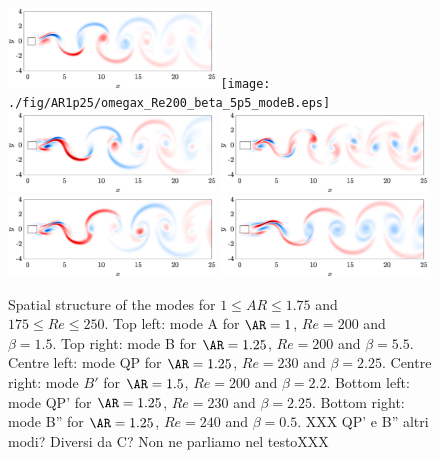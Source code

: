 %
\begin{figure}
  \centering
  \includegraphics[width=0.49\textwidth]{./fig/AR1/omegax_Re200_beta_1p5_modeA.eps}
  \texttt{[image: ./fig/AR1p25/omegax\_Re200\_beta\_5p5\_modeB.eps]}
  \includegraphics[width=0.49\textwidth]{./fig/AR1p25/omegax_Re230_beta_2p25_modeC.eps}
  \includegraphics[width=0.49\textwidth]{./fig/AR1p5/omegax_Re200_beta_2p2_modeBp.eps}
  \includegraphics[width=0.49\textwidth]{./fig/AR1p25/omegax_Re230_beta_2p25_modeD.eps}
  \includegraphics[width=0.49\textwidth]{./fig/AR1p25/omegax_Re240_beta_0p5_modeBpp.eps}
  \caption{Spatial structure of the modes for $1 \le AR \le 1.75$ and $175 \le Re \le 250$. Top left: mode A for $\AR=1$, $Re=200$ and $\beta=1.5$. Top right: mode B for $\AR=1.25$, $Re=200$ and $\beta=5.5$. Centre left: mode QP for $\AR=1.25$, $Re=230$ and $\beta = 2.25$. Centre right: mode $B'$ for $\AR=1.5$, $Re=200$ and $\beta=2.2$. Bottom left: mode QP' for $\AR=1.25$, $Re=230$ and $\beta=2.25$. Bottom right: mode B'' for $\AR=1.25$, $Re=240$ and $\beta=0.5$. XXX QP' e B'' altri modi? Diversi da C? Non ne parliamo nel testoXXX}
  \label{fig:modes}
\end{figure}
